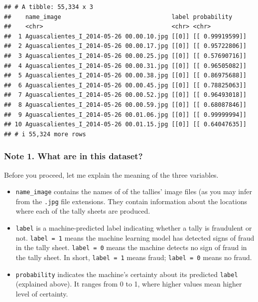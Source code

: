 \documentclass[
]{article}
\begin{document}
\begin{verbatim}
## # A tibble: 55,334 x 3
##    name_image                               label probability    
##    <chr>                                    <chr> <chr>          
##  1 Aguascalientes_I_2014-05-26 00.00.10.jpg [[0]] [[ 0.99919599]]
##  2 Aguascalientes_I_2014-05-26 00.00.17.jpg [[0]] [[ 0.95722806]]
##  3 Aguascalientes_I_2014-05-26 00.00.25.jpg [[0]] [[ 0.57690716]]
##  4 Aguascalientes_I_2014-05-26 00.00.31.jpg [[0]] [[ 0.96505082]]
##  5 Aguascalientes_I_2014-05-26 00.00.38.jpg [[0]] [[ 0.86975688]]
##  6 Aguascalientes_I_2014-05-26 00.00.45.jpg [[0]] [[ 0.78825063]]
##  7 Aguascalientes_I_2014-05-26 00.00.52.jpg [[0]] [[ 0.96493018]]
##  8 Aguascalientes_I_2014-05-26 00.00.59.jpg [[0]] [[ 0.68087846]]
##  9 Aguascalientes_I_2014-05-26 00.01.06.jpg [[0]] [[ 0.99999994]]
## 10 Aguascalientes_I_2014-05-26 00.01.15.jpg [[0]] [[ 0.64047635]]
## # i 55,324 more rows
\end{verbatim}

\clearpage

\hypertarget{note-1.-what-are-in-this-dataset}{%
\subsubsection{Note 1. What are in this
dataset?}\label{note-1.-what-are-in-this-dataset}}

Before you proceed, let me explain the meaning of the three variables.

\begin{itemize}
\item
  \texttt{name\_image} contains the names of of the tallies' image files
  (as you may infer from the \texttt{.jpg} file extensions. They contain
  information about the locations where each of the tally sheets are
  produced.
\item
  \texttt{label} is a machine-predicted label indicating whether a tally
  is fraudulent or not. \texttt{label\ =\ 1} means the machine learning
  model has detected signs of fraud in the tally sheet.
  \texttt{label\ =\ 0} means the machine detects no sign of fraud in the
  tally sheet. In short, \texttt{label\ =\ 1} means fraud;
  \texttt{label\ =\ 0} means no fraud.
\item
  \texttt{probability} indicates the machine's certainty about its
  predicted \texttt{label} (explained above). It ranges from 0 to 1,
  where higher values mean higher level of certainty.
\end{itemize}
\end{document}
